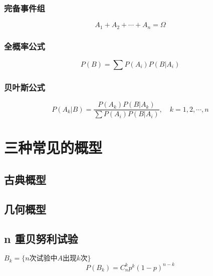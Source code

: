 \subsubsection{完备事件组}
\label{ssub:完备事件组}

\[
    A_1 + A_2 + \cdots + A_n = \Omega
\]

\subsubsection{全概率公式}
\label{ssub:全概率公式}

\[
    P(B) = \sum P(A_i) P(B | A_i)
\]

\subsubsection{贝叶斯公式}
\label{ssub:贝叶斯公式}

\[
    P(A_k | B ) = \frac{P(A_k) P(B | A_k)}{\sum P(A_i) P(B | A_i)}, \quad k = 1, 2, \cdots , n
\]

\section{三种常见的概型}
\label{sec:三种常见的概型}

\subsection{古典概型}
\label{sub:古典概型}

\subsection{几何概型}
\label{sub:几何概型}

\subsection{n 重贝努利试验}
\label{sub:n_重贝努利试验}

$B_k= \{ n \text{次试验中}A \text{出现}k\text{次} \}$
\[
    P(B_k) = C_n^k p^k (1-p)^{n-k}
\]
